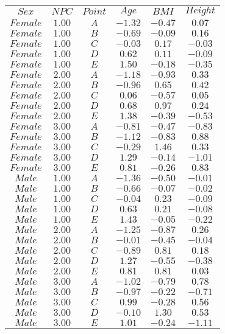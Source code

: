 \begin{tabular}{cccccc}
$Sex$ & $NPC$ & $Point$ & $Age$ & $BMI$ & $Height$\\
$Female$ & $1.00$ & $A$ & $-1.32$ & $-0.47$ & $0.07$\\
$Female$ & $1.00$ & $B$ & $-0.69$ & $-0.09$ & $0.16$\\
$Female$ & $1.00$ & $C$ & $-0.03$ & $0.17$ & $-0.03$\\
$Female$ & $1.00$ & $D$ & $0.62$ & $0.11$ & $-0.09$\\
$Female$ & $1.00$ & $E$ & $1.50$ & $-0.18$ & $-0.35$\\
$Female$ & $2.00$ & $A$ & $-1.18$ & $-0.93$ & $0.33$\\
$Female$ & $2.00$ & $B$ & $-0.96$ & $0.65$ & $0.42$\\
$Female$ & $2.00$ & $C$ & $0.06$ & $-0.57$ & $0.05$\\
$Female$ & $2.00$ & $D$ & $0.68$ & $0.97$ & $0.24$\\
$Female$ & $2.00$ & $E$ & $1.38$ & $-0.39$ & $-0.53$\\
$Female$ & $3.00$ & $A$ & $-0.81$ & $-0.47$ & $-0.83$\\
$Female$ & $3.00$ & $B$ & $-1.12$ & $-0.83$ & $0.88$\\
$Female$ & $3.00$ & $C$ & $-0.29$ & $1.46$ & $0.33$\\
$Female$ & $3.00$ & $D$ & $1.29$ & $-0.14$ & $-1.01$\\
$Female$ & $3.00$ & $E$ & $0.81$ & $-0.26$ & $0.83$\\
$Male$ & $1.00$ & $A$ & $-1.36$ & $-0.50$ & $-0.01$\\
$Male$ & $1.00$ & $B$ & $-0.66$ & $-0.07$ & $-0.02$\\
$Male$ & $1.00$ & $C$ & $-0.04$ & $0.23$ & $-0.09$\\
$Male$ & $1.00$ & $D$ & $0.63$ & $0.21$ & $-0.08$\\
$Male$ & $1.00$ & $E$ & $1.43$ & $-0.05$ & $-0.22$\\
$Male$ & $2.00$ & $A$ & $-1.25$ & $-0.87$ & $0.26$\\
$Male$ & $2.00$ & $B$ & $-0.01$ & $-0.45$ & $-0.04$\\
$Male$ & $2.00$ & $C$ & $-0.89$ & $0.81$ & $0.18$\\
$Male$ & $2.00$ & $D$ & $1.27$ & $-0.55$ & $-0.38$\\
$Male$ & $2.00$ & $E$ & $0.81$ & $0.81$ & $0.03$\\
$Male$ & $3.00$ & $A$ & $-1.02$ & $-0.79$ & $0.78$\\
$Male$ & $3.00$ & $B$ & $-0.97$ & $-0.22$ & $-0.71$\\
$Male$ & $3.00$ & $C$ & $0.99$ & $-0.28$ & $0.56$\\
$Male$ & $3.00$ & $D$ & $-0.10$ & $1.30$ & $0.53$\\
$Male$ & $3.00$ & $E$ & $1.01$ & $-0.24$ & $-1.11$\\
\end{tabular}
